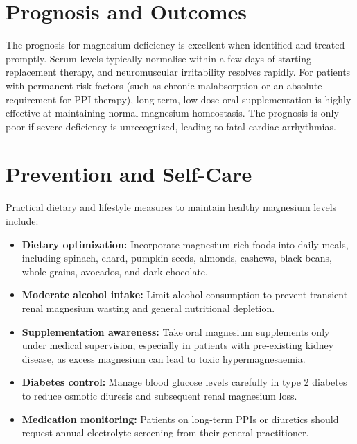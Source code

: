 \section*{Prognosis and Outcomes}
The prognosis for magnesium deficiency is excellent when identified and treated promptly. Serum levels typically normalise within a few days of starting replacement therapy, and neuromuscular irritability resolves rapidly. For patients with permanent risk factors (such as chronic malabsorption or an absolute requirement for PPI therapy), long-term, low-dose oral supplementation is highly effective at maintaining normal magnesium homeostasis. The prognosis is only poor if severe deficiency is unrecognized, leading to fatal cardiac arrhythmias.

\section*{Prevention and Self-Care}
Practical dietary and lifestyle measures to maintain healthy magnesium levels include:
\begin{itemize}
    \item \textbf{Dietary optimization:} Incorporate magnesium-rich foods into daily meals, including spinach, chard, pumpkin seeds, almonds, cashews, black beans, whole grains, avocados, and dark chocolate.
    \item \textbf{Moderate alcohol intake:} Limit alcohol consumption to prevent transient renal magnesium wasting and general nutritional depletion.
    \item \textbf{Supplementation awareness:} Take oral magnesium supplements only under medical supervision, especially in patients with pre-existing kidney disease, as excess magnesium can lead to toxic hypermagnesaemia.
    \item \textbf{Diabetes control:} Manage blood glucose levels carefully in type 2 diabetes to reduce osmotic diuresis and subsequent renal magnesium loss.
    \item \textbf{Medication monitoring:} Patients on long-term PPIs or diuretics should request annual electrolyte screening from their general practitioner.
\end{itemize}

